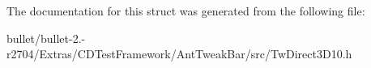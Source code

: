 The documentation for this struct was generated from the following file\+:\begin{DoxyCompactItemize}
\item 
bullet/bullet-\/2.-\/r2704/\+Extras/\+C\+D\+Test\+Framework/\+Ant\+Tweak\+Bar/src/Tw\+Direct3\+D10.\+h\end{DoxyCompactItemize}
